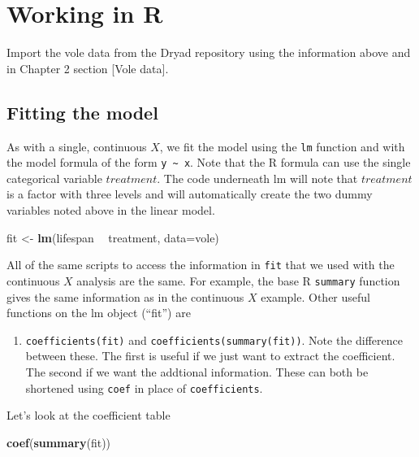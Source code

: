 \documentclass[]{book}
\newenvironment{Shaded}{\begin{snugshade}}{\end{snugshade}}
\newcommand{\DataTypeTok}[1]{\textcolor[rgb]{0.13,0.29,0.53}{#1}}
\newcommand{\KeywordTok}[1]{\textcolor[rgb]{0.13,0.29,0.53}{\textbf{#1}}}
\newcommand{\NormalTok}[1]{#1}
\newcommand{\OperatorTok}[1]{\textcolor[rgb]{0.81,0.36,0.00}{\textbf{#1}}}
\newcommand{\StringTok}[1]{\textcolor[rgb]{0.31,0.60,0.02}{#1}}
\providecommand{\tightlist}{%
  \setlength{\itemsep}{0pt}\setlength{\parskip}{0pt}}
\begin{document}
\hypertarget{working-in-r-2}{%
\section{Working in R}\label{working-in-r-2}}

Import the vole data from the Dryad repository using the information above and in Chapter 2 section {[}Vole data{]}.

\hypertarget{fitting-the-model-1}{%
\subsection{Fitting the model}\label{fitting-the-model-1}}

As with a single, continuous \(X\), we fit the model using the \texttt{lm} function and with the model formula of the form \texttt{y\ \textasciitilde{}\ x}. Note that the R formula can use the single categorical variable \(treatment\). The code underneath lm will note that \(treatment\) is a factor with three levels and will automatically create the two dummy variables noted above in the linear model.

\begin{Shaded}
\begin{Highlighting}[]
\NormalTok{fit <-}\StringTok{ }\KeywordTok{lm}\NormalTok{(lifespan }\OperatorTok{~}\StringTok{ }\NormalTok{treatment, }\DataTypeTok{data=}\NormalTok{vole)}
\end{Highlighting}
\end{Shaded}

All of the same scripts to access the information in \texttt{fit} that we used with the continuous \(X\) analysis are the same. For example, the base R \texttt{summary} function gives the same information as in the continuous \(X\) example. Other useful functions on the lm object (``fit'') are

\begin{enumerate}
\def\labelenumi{\arabic{enumi}.}
\tightlist
\item
  \texttt{coefficients(fit)} and \texttt{coefficients(summary(fit))}. Note the difference between these. The first is useful if we just want to extract the coefficient. The second if we want the addtional information. These can both be shortened using \texttt{coef} in place of \texttt{coefficients}.
\end{enumerate}

Let's look at the coefficient table

\begin{Shaded}
\begin{Highlighting}[]
\KeywordTok{coef}\NormalTok{(}\KeywordTok{summary}\NormalTok{(fit))}
\end{Highlighting}
\end{Shaded}
\end{document}
